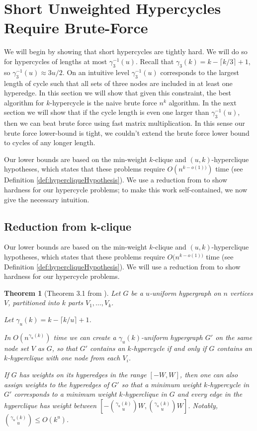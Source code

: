 \documentclass[11pt,letterpaper,pdftex]{article}
\newtheorem{theorem}{Theorem}[section]
\begin{document}
%
 
\section{Short Unweighted Hypercycles Require Brute-Force}
\label{sec:lb_unweighted}


We will begin by showing that short hypercycles are tightly hard. We will do so for hypercycles of lengths at most $\gamma_3^{-1}(u)$. Recall that $\gamma_3(k) = k - \lceil k/3 \rceil +1$, so $\gamma_3^{-1}(u) \approx 3u/2$.  On an intuitive level $\gamma_3^{-1}(u)$ corresponds to the largest length of cycle such that all sets of three nodes are included in at least one hyperedge. In this section we will show that given this constraint, the best algorithm for $k$-hypercycle is the naive brute force $n^k$ algorithm. In the next section we will show that if the cycle length is even one larger than $\gamma_3^{-1}(u)$, then we can beat brute force using fast matrix multiplication. In this sense our brute force lower-bound is tight, we couldn't extend the brute force lower bound to cycles of any longer length. 


Our lower bounds are based on the min-weight $k$-clique and $(u,k)$-hyperclique hypotheses, which states that these problems require $O(n^{k-o(1))})$ time (see Definition \ref{def:hypercliqueHypothesis}). 
We use a reduction from \cite{LVW18} to show hardness for our hypercycle problems; to make this work self-contained, we now give the necessary intuition.

\subsection{Reduction from k-clique}
\label{subsec:prevCliquetoCycle}

Our lower bounds are based on the min-weight $k$-clique and $(u,k)$-hyperclique hypotheses, which states that these problems require $O(n^{k-o(1))}$ time (see Definition \ref{def:hypercliqueHypothesis}).
We will use a reduction from \cite{LVW18} to show hardness for our hypercycle problems.

\begin{theorem}[Theorem 3.1 from \cite{LVW18}] 


    Let $G$ be a $u$-uniform hypergraph on $n$ vertices $V$, partitioned into $k$ parts $V_1,\ldots,V_k$. 
    
    Let $\gamma_u(k)=k-\lceil k/u\rceil +1$.
    
    In $O(n^{\gamma_u(k)})$ time we can create a $\gamma_u(k)$-uniform hypergraph $G'$ on the same node set $V$ as $G$, so that $G'$ contains an $k$-hypercycle if and only if $G$ contains an $k$-hyperclique with one node from each $V_i$.
    
    If $G$ has weights on its hyperedges in the range $[-W,W]$, then one can also assign weights to the hyperedges of $G'$ so that a minimum weight $k$-hypercycle in $G'$ corresponds to a minimum weight $k$-hyperclique in $G$ and every edge in the hyperclique has weight between $[-\binom{\gamma_u(k)}{u}W,\binom{\gamma_u(k)}{u}W]$. Notably, $\binom{\gamma_u(k)}{u}\leq O(k^u)$.
\end{theorem}
\end{document}
